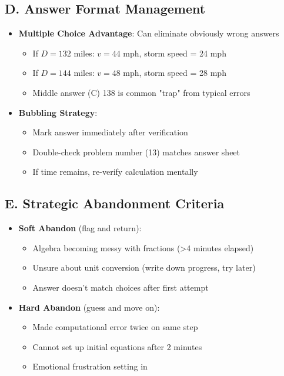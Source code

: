 \documentclass[11pt]{article}
\begin{document}
\begin{competitionbox}
\subsection*{D. Answer Format Management}
\begin{itemize}[leftmargin=*]
    \item \textbf{Multiple Choice Advantage}: Can eliminate obviously wrong answers
    \begin{itemize}[leftmargin=*]
        \item If $D = 132$ miles: $v = 44$ mph, storm speed = 24 mph
        \item If $D = 144$ miles: $v = 48$ mph, storm speed = 28 mph
        \item Middle answer (C) 138 is common "trap" from typical errors
    \end{itemize}
    
    \item \textbf{Bubbling Strategy}: 
    \begin{itemize}[leftmargin=*]
        \item Mark answer immediately after verification
        \item Double-check problem number (13) matches answer sheet
        \item If time remains, re-verify calculation mentally
    \end{itemize}
\end{itemize}

\subsection*{E. Strategic Abandonment Criteria}
\begin{itemize}[leftmargin=*]
    \item \textbf{Soft Abandon} (flag and return):
    \begin{itemize}[leftmargin=*]
        \item Algebra becoming messy with fractions (>4 minutes elapsed)
        \item Unsure about unit conversion (write down progress, try later)
        \item Answer doesn't match choices after first attempt
    \end{itemize}
    
    \item \textbf{Hard Abandon} (guess and move on):
    \begin{itemize}[leftmargin=*]
        \item Made computational error twice on same step
        \item Cannot set up initial equations after 2 minutes
        \item Emotional frustration setting in
    \end{itemize}
    

\end{itemize}
\end{competitionbox}
\end{document}
